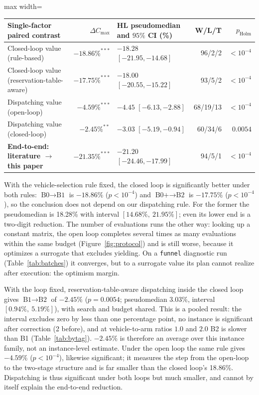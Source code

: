 \documentclass[preprint,review,12pt,authoryear]{elsarticle}
\newcommand{\GainLoopRule}{18.86\%}      %
\newcommand{\PLoopRule}{<10^{-4}}
\newcommand{\GainLoopProbe}{17.75\%}     %
\newcommand{\PLoopProbe}{<10^{-4}}
\newcommand{\GainProbeOpen}{4.59\%}      %
\newcommand{\PProbeOpen}{<10^{-4}}
\newcommand{\GainProbeLoop}{2.45\%}      %
\newcommand{\PProbeLoop}{=0.0054}
\newcommand{\HLLoopRule}{18.28\%}
\newcommand{\CILoopRule}{$[14.68\%,\ 21.95\%]$}
\newcommand{\HLProbeLoop}{3.03\%}
\newcommand{\CIProbeLoop}{$[0.94\%,\ 5.19\%]$}
\newcommand{\CellsSigProbe}{2}
\begin{document}
\begin{table}[!htbp]
\vspace{0.6em}

\begin{adjustbox}{max width=\linewidth}\begin{tabular}{@{}lrlrr@{}}
\toprule
Single-factor paired contrast & $\Delta C_{\max}$ & HL pseudomedian and $95\%$ CI (\%) & W/L/T & $p_{\mathrm{Holm}}$ \\
\midrule
Closed-loop value (rule-based) & $-18.86\%^{***}$ & $-18.28$ $[-21.95,-14.68]$ & 96/2/2 & $<10^{-4}$ \\
Closed-loop value (reservation-table-aware) & $-17.75\%^{***}$ & $-18.00$ $[-20.55,-15.22]$ & 93/5/2 & $<10^{-4}$ \\
Dispatching value (open-loop) & $-4.59\%^{***}$ & $-4.45$ $[-6.13,-2.88]$ & 68/19/13 & $<10^{-4}$ \\
Dispatching value (closed-loop) & $-2.45\%^{**}$ & $-3.03$ $[-5.19,-0.94]$ & 60/34/6 & $0.0054$ \\
\midrule
\textbf{End-to-end: literature $\rightarrow$ this paper} & $-21.35\%^{***}$ & $-21.20$ $[-24.46,-17.99]$ & 94/5/1 & $<10^{-4}$ \\
\bottomrule
\end{tabular}\end{adjustbox}
\end{table}

With the vehicle-selection rule fixed, the closed loop is significantly better under both rules: $\text{B0}\to\text{B1}$ is $-\GainLoopRule$ ($p\PLoopRule$) and $\text{B0+}\to\text{B2}$ is $-\GainLoopProbe$ ($p\PLoopProbe$), so the conclusion does not depend on our dispatching rule.
For the former the pseudomedian is \HLLoopRule{} with interval \CILoopRule{}; even its lower end is a two-digit reduction.
The number of evaluations runs the other way: looking up a constant matrix, the open loop completes several times as many evaluations within the same budget (Figure~\ref{fig:protocol}) and is still worse, because it optimizes a surrogate that excludes yielding.
On a \texttt{funnel} diagnostic run (Table~\ref{tab:batches}) it converges, but to a surrogate value its plan cannot realize after execution: the optimism margin.

With the loop fixed, reservation-table-aware dispatching inside the closed loop gives $\text{B1}\to\text{B2}$ of $-\GainProbeLoop$ ($p\PProbeLoop$; pseudomedian \HLProbeLoop{}, interval \CIProbeLoop{}), with search and budget shared.
This is a pooled result: the interval excludes zero by less than one percentage point, no instance is significant after correction (\CellsSigProbe{} before), and at vehicle-to-arm ratios $1.0$ and $2.0$ B2 is slower than B1 (Table~\ref{tab:bytag}).
$-\GainProbeLoop$ is therefore an average over this instance family, not an instance-level estimate.
Under the open loop the same rule gives $-\GainProbeOpen$ ($p\PProbeOpen$), likewise significant; it measures the step from the open-loop to the two-stage structure and is far smaller than the closed loop's \GainLoopRule{}.
Dispatching is thus significant under both loops but much smaller, and cannot by itself explain the end-to-end reduction.
\end{document}
